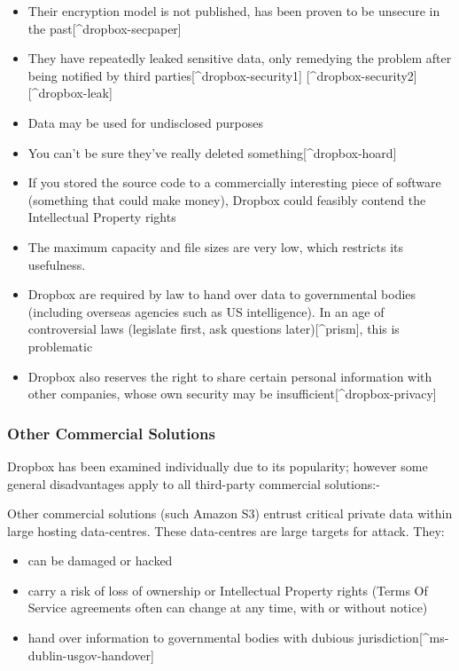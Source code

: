 \documentclass[12pt,a4paper,]{book}
\begin{document}
\begin{itemize}
\itemsep1pt\parskip0pt
\item
  Their encryption model is not published, has been proven to be
  unsecure in the past{[}\^{}dropbox-secpaper{]}
\item
  They have repeatedly leaked sensitive data, only remedying the problem
  after being notified by third parties{[}\^{}dropbox-security1{]}
  {[}\^{}dropbox-security2{]} {[}\^{}dropbox-leak{]}
\item
  Data may be used for undisclosed purposes
\item
  You can't be sure they've really deleted
  something{[}\^{}dropbox-hoard{]}
\item
  If you stored the source code to a commercially interesting piece of
  software (something that could make money), Dropbox could feasibly
  contend the Intellectual Property rights
\item
  The maximum capacity and file sizes are very low, which restricts its
  usefulness.
\item
  Dropbox are required by law to hand over data to governmental bodies
  (including overseas agencies such as US intelligence). In an age of
  controversial laws (legislate first, ask questions
  later){[}\^{}prism{]}, this is problematic
\item
  Dropbox also reserves the right to share certain personal information
  with other companies, whose own security may be
  insufficient{[}\^{}dropbox-privacy{]}
\end{itemize}

\subsubsection{Other Commercial
Solutions}\label{other-commercial-solutions}

Dropbox has been examined individually due to its popularity; however
some general disadvantages apply to all third-party commercial
solutions:-

Other commercial solutions (such Amazon S3) entrust critical private
data within large hosting data-centres. These data-centres are large
targets for attack. They:

\begin{itemize}
\itemsep1pt\parskip0pt
\item
  can be damaged or hacked
\item
  carry a risk of loss of ownership or Intellectual Property rights
  (Terms Of Service agreements often can change at any time, with or
  without notice)
\item
  hand over information to governmental bodies with dubious
  jurisdiction{[}\^{}ms-dublin-usgov-handover{]}
\end{itemize}
\end{document}
